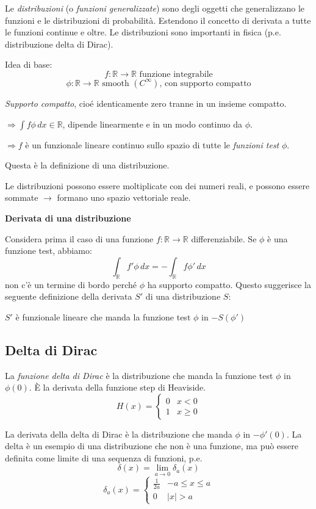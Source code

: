\documentclass[a4paper,11pt]{report}
\newcommand{\R}{\mathbb{R}}
\begin{document}
Le \emph{distribuzioni} (o \emph{funzioni generalizzate}) sono degli oggetti che generalizzano le funzioni e le distribuzioni di probabilit\`a.
Estendono il concetto di derivata a tutte le funzioni continue e oltre.
Le distribuzioni sono importanti in fisica (p.e. distribuzione delta di Dirac).

\medskip
Idea di base:
\[
f:\R\rightarrow\R \text{ funzione integrabile}
\]
\[
\phi : \R \rightarrow \R \text{ smooth $\left(C^{\infty}\right)$, con supporto compatto} 
\]

\emph{Supporto compatto}, cio\'e identicamente zero tranne in un insieme compatto.

\smallskip

$\Rightarrow \int f \phi \, dx \in \mathbb{R}$, dipende linearmente e in un modo continuo da $\phi$.

\smallskip

$\Rightarrow f$ \`e un funzionale lineare continuo sullo spazio di tutte le \emph{funzioni test} $\phi.$

\smallskip

Questa \`e la definizione di una distribuzione.

Le distribuzioni possono essere moltiplicate con dei numeri reali, e possono essere sommate $\rightarrow$ formano uno spazio vettoriale reale.

\medskip

\textbf{Derivata di una distribuzione}

Considera prima il caso di una funzione $f:\R \rightarrow \R$ differenziabile. Se $\phi$ \`e una funzione test, abbiamo:
\[
\int_{\R}f'\phi \,dx = -\int_{\R}f\phi ' \,dx
\]
non c'\`e un termine di bordo perch\'e $\phi $ ha supporto compatto. 
Questo suggerisce la seguente definizione della derivata $S'$ di una distribuzione $S$:

$S'$ \`e funzionale lineare che manda la funzione test $\phi$ in $-S\left(\phi'\right)$

\subsection{Delta di Dirac}
La \emph{funzione delta di Dirac} \`e la distribuzione che manda la funzione test $\phi$ in $\phi(0)$. \`E la derivata della funzione step di Heaviside.
\[
H(x)=\begin{cases}
0 & x < 0 \\
1 & x \geq 0
\end{cases}
\]

La derivata della delta di Dirac \`e la distribuzione che manda $\phi$ in $-\phi '(0)$. La delta \`e un esempio di una distribuzione che non \`e una funzione, ma pu\`o essere definita come limite di una sequenza di funzioni, p.e.
\[
\delta\left(x\right) = \lim_{a\to 0}\delta_a\left(x\right)
\]
\[
\delta_a(x) = \begin{cases}
\frac{1}{2a} & -a\leq x\leq a\\
0 & |x| > a
\end{cases}
\]
\end{document}
